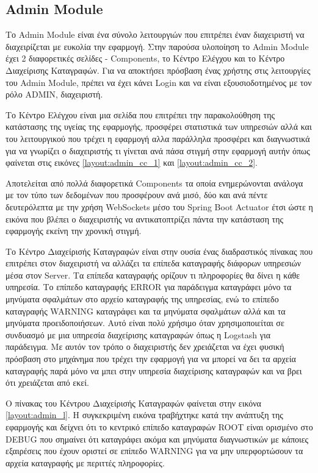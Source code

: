 \subsection{Admin Module}
Το Admin Module είναι ένα σύνολο λειτουργιών που επιτρέπει έναν διαχειριστή να διαχειρίζεται με ευκολία την εφαρμογή. Στην παρούσα υλοποίηση το Admin Module έχει 2 διαφορετικές σελίδες - Components, το Κέντρο Ελέγχου και το Κέντρο Διαχείρισης Καταγραφών. Για να αποκτήσει πρόσβαση ένας χρήστης στις λειτουργίες του Admin Module, πρέπει να έχει κάνει Login και να είναι εξουσιοδοτημένος με τον ρόλο ADMIN, διαχειριστή. 

Το Κέντρο Ελέγχου είναι μια σελίδα που επιτρέπει την παρακολούθηση της κατάστασης της υγείας της εφαρμογής, προσφέρει στατιστικά των υπηρεσιών αλλά και του λειτουργικού που τρέχει η εφαρμογή αλλα παράλληλα προσφέρει και διαγνωστικά για να γνωρίζει ο διαχειριστής τι γίνεται ανά πάσα στιγμή στην εφαρμογή αυτήν όπως φαίνεται στις εικόνες \ref{layout:admin_cc_1} και \ref{layout:admin_cc_2}. 

Αποτελείται από πολλά διαφορετικά Components τα οποία ενημερώνονται ανάλογα με τον τύπο των δεδομένων που προσφέρουν ανά μισό, δύο και ανά πέντε δευτερόλεπτα με την χρήση WebSockets μέσο του Spring Boot Actuator έτσι ώστε η εικόνα που βλέπει ο διαχειριστής να αντικατοπτρίζει πάντα την κατάσταση της εφαρμογής εκείνη την χρονική στιγμή.

Το Κέντρο Διαχείρισής Καταγραφών είναι στην ουσία ένας διαδραστικός πίνακας που επιτρέπει στον διαχειριστή να αλλάζει τα επίπεδα καταγραφής διάφορων υπηρεσιών μέσα στον Server. Τα επίπεδα καταγραφής ορίζουν τι πληροφορίες θα δίνει η κάθε υπηρεσία. Το επίπεδο καταγραφής ERROR για παράδειγμα καταγράφει μόνο τα μηνύματα σφαλμάτων στο αρχείο καταγραφής της υπηρεσίας, ενώ το επίπεδο καταγραφής WARNING καταγράφει και τα μηνύματα σφαλμάτων αλλά και τα μηνύματα προειδοποιήσεων. Αυτό είναι πολύ χρήσιμο όταν χρησιμοποιείται σε συνδυασμό με μια υπηρεσία διαχείρισης καταγραφών όπως η Logstash για παράδειγμα. Με αυτόν τον τρόπο ο διαχειριστής δεν χρειάζεται να έχει φυσική πρόσβαση στο μηχάνημα που τρέχει την εφαρμογή για να μπορεί να δει τα αρχεία καταγραφής παρά μόνο να μπει στην υπηρεσία διαχείρισης καταγραφών και να βρει ότι χρειάζεται από εκεί.

Ο πίνακας του Κέντρου Διαχείρισής Καταγραφών φαίνεται στην εικόνα \ref{layout:admin_l}. Η συγκεκριμένη εικόνα τραβήχτηκε κατά την ανάπτυξη της εφαρμογής και δείχνει ότι το κεντρικό επίπεδο καταγραφών ROOT είναι ορισμένο στο DEBUG που σημαίνει ότι καταγράφει ακόμα και μηνύματα διαγνωστικών με κάποιες εξαιρέσεις που έχουν οριστεί σε επίπεδο WARNING για να μην υπερφορτώσουν τα αρχεία καταγραφής με περιττές πληροφορίες.

